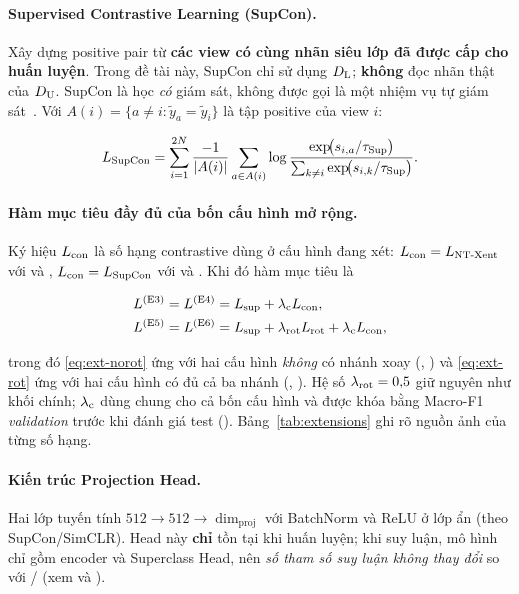 \paragraph{Supervised Contrastive Learning (SupCon).}
Xây dựng positive pair từ \textbf{các view có cùng nhãn siêu lớp đã được cấp cho huấn luyện}.
Trong đề tài này, SupCon chỉ sử dụng $D_{\mathrm{L}}$; \textbf{không} đọc nhãn thật của $D_{\mathrm{U}}$. SupCon là
học \emph{có} giám sát, không được gọi là một nhiệm vụ tự giám sát~\cite{khosla2020supcon}. Với
$A(i) = \{a \neq i : \tilde{y}_a = \tilde{y}_i\}$ là tập positive của view $i$:

\begin{equation}
  L_{\mathrm{SupCon}}
  = \sum_{i=1}^{2N} \frac{-1}{|A(i)|}
    \sum_{a \in A(i)} \log
    \frac{\exp\!\bigl(s_{i,a}/\tau_{\mathrm{Sup}}\bigr)}
         {\sum_{k \neq i} \exp\!\bigl(s_{i,k}/\tau_{\mathrm{Sup}}\bigr)}.
  \label{eq:supcon}
\end{equation}

\paragraph{Hàm mục tiêu đầy đủ của bốn cấu hình mở rộng.}
Ký hiệu $L_{\mathrm{con}}$ là số hạng contrastive dùng ở cấu hình đang xét: $L_{\mathrm{con}} = L_{\mathrm{NT\text{-}Xent}}$ với
 và , $L_{\mathrm{con}} = L_{\mathrm{SupCon}}$ với  và . Khi đó hàm mục tiêu là

\begin{align}
  L^{(\mathrm{E3})} = L^{(\mathrm{E4})} &= L_{\mathrm{sup}} + \lambda_{\mathrm{c}} L_{\mathrm{con}}, \label{eq:ext-norot}\\
  L^{(\mathrm{E5})} = L^{(\mathrm{E6})} &= L_{\mathrm{sup}} + \lambda_{\mathrm{rot}} L_{\mathrm{rot}} + \lambda_{\mathrm{c}} L_{\mathrm{con}}, \label{eq:ext-rot}
\end{align}

trong đó \eqref{eq:ext-norot} ứng với hai cấu hình \emph{không} có nhánh xoay (,
) và \eqref{eq:ext-rot} ứng với hai cấu hình có đủ cả ba nhánh (, ).
Hệ số $\lambda_{\mathrm{rot}} = 0{,}5$ giữ nguyên như khối chính; $\lambda_{\mathrm{c}}$ dùng chung cho cả bốn cấu hình và
được khóa bằng Macro-F1 \emph{validation} trước khi đánh giá test ().
Bảng~\ref{tab:extensions} ghi rõ nguồn ảnh của từng số hạng.

\paragraph{Kiến trúc Projection Head.}
Hai lớp tuyến tính $512 \to 512 \to \dim_{\mathrm{proj}}$ với BatchNorm và ReLU ở lớp ẩn
(theo SupCon/SimCLR). Head này \textbf{chỉ} tồn tại khi huấn luyện; khi suy luận, mô hình chỉ
gồm encoder và Superclass Head, nên \emph{số tham số suy luận không thay đổi} so với
/ (xem  và ).


